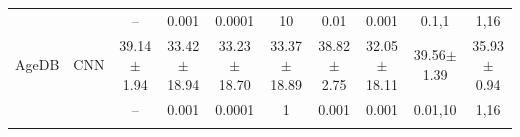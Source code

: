\begin{table}[t]
\begin{center}
\begin{tabular}{llcccccccc}
 & & {\tiny --} & {\tiny 0.001} & {\tiny 0.0001} & {\tiny 10} & {\tiny 0.01} & {\tiny 0.001} & {\tiny 0.1,1} & {\tiny 1,16} \\[0.4ex]
AgeDB & CNN & 39.14$\pm$1.94 & 33.42$\pm$18.94 & 33.23$\pm$18.70 & 33.37$\pm$18.89 & 38.82$\pm$2.75 & 32.05$\pm$18.11 & 39.56$\pm$1.39 & 35.93$\pm$0.94 \\
 & & {\tiny --} & {\tiny 0.001} & {\tiny 0.0001} & {\tiny 1} & {\tiny 0.001} & {\tiny 0.001} & {\tiny 0.01,10} & {\tiny 1,16} \\[0.4ex]
\\[-1.5ex]
\end{tabular}\end{center}\end{table}
